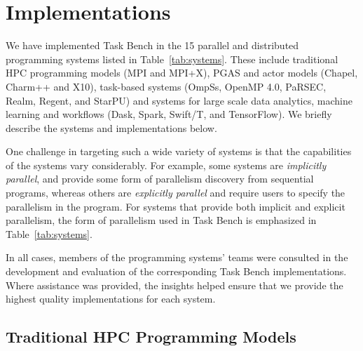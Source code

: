 \section{Implementations}
\label{sec:implementation}



We have implemented Task Bench in the 15 parallel and distributed
programming systems listed in Table~\ref{tab:systems}. These include
traditional HPC programming models (MPI and MPI+X), PGAS and actor
models (Chapel, Charm++ and X10), task-based systems (OmpSs, OpenMP
4.0, PaRSEC, Realm, Regent, and StarPU) and systems for large scale
data analytics, machine learning and workflows (Dask, Spark, Swift/T,
and TensorFlow). We briefly describe the systems and implementations
below.

One challenge in targeting such a wide variety of
systems is that the capabilities of the systems vary considerably. For
example, some systems are \emph{implicitly parallel}, and provide some
form of parallelism discovery from sequential programs, whereas others
are \emph{explicitly parallel} and require users to specify the
parallelism in the program. For systems that provide both implicit and explicit parallelism, the form of parallelism used in Task Bench is emphasized in Table~\ref{tab:systems}.



In all cases, members of the programming systems' teams
were consulted in the development and evaluation of the
corresponding Task Bench implementations. Where assistance was provided, the insights helped ensure that we provide the highest quality implementations for each system.

\subsection{Traditional HPC Programming Models}

